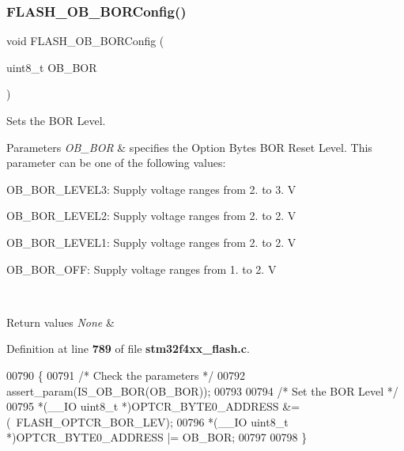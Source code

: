 \subsubsection{F\+L\+A\+S\+H\+\_\+\+O\+B\+\_\+\+B\+O\+R\+Config()}
{\footnotesize\ttfamily void F\+L\+A\+S\+H\+\_\+\+O\+B\+\_\+\+B\+O\+R\+Config (\begin{DoxyParamCaption}\item[{uint8\+\_\+t}]{O\+B\+\_\+\+B\+OR }\end{DoxyParamCaption})}



Sets the B\+OR Level. 


\begin{DoxyParams}{Parameters}
{\em O\+B\+\_\+\+B\+OR} & specifies the Option Bytes B\+OR Reset Level. This parameter can be one of the following values\+: \begin{DoxyItemize}
\item O\+B\+\_\+\+B\+O\+R\+\_\+\+L\+E\+V\+E\+L3\+: Supply voltage ranges from 2. to 3. V \item O\+B\+\_\+\+B\+O\+R\+\_\+\+L\+E\+V\+E\+L2\+: Supply voltage ranges from 2. to 2. V \item O\+B\+\_\+\+B\+O\+R\+\_\+\+L\+E\+V\+E\+L1\+: Supply voltage ranges from 2. to 2. V \item O\+B\+\_\+\+B\+O\+R\+\_\+\+O\+FF\+: Supply voltage ranges from 1. to 2. V \end{DoxyItemize}
\\
\hline
\end{DoxyParams}

\begin{DoxyRetVals}{Return values}
{\em None} & \\
\hline
\end{DoxyRetVals}


Definition at line \textbf{ 789} of file \textbf{ stm32f4xx\+\_\+flash.\+c}.


\begin{DoxyCode}
00790 \{
00791   \textcolor{comment}{/* Check the parameters */}
00792   assert_param(IS_OB_BOR(OB\_BOR));
00793 
00794   \textcolor{comment}{/* Set the BOR Level */}
00795   *(\_\_IO uint8\_t *)OPTCR_BYTE0_ADDRESS &= (~FLASH_OPTCR_BOR_LEV);
00796   *(\_\_IO uint8\_t *)OPTCR_BYTE0_ADDRESS |= OB\_BOR;
00797 
00798 \}
\end{DoxyCode}
\mbox{\label{group__FLASH_gab8a8804905929b2edd544d28c2e7b215}} 
